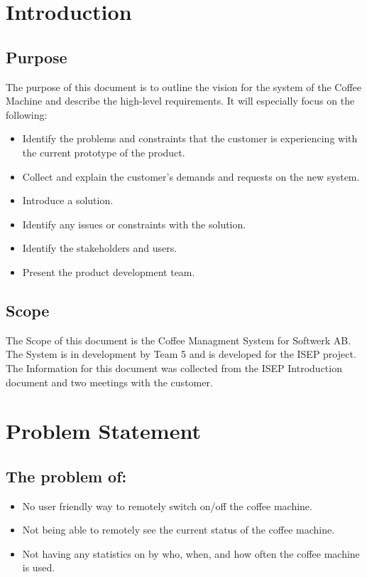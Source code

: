 \section{Introduction}

\subsection{Purpose}

The purpose of this document is to outline the vision for the system of the Coffee Machine and describe the high-level requirements. It will especially focus on the following:

\begin{itemize}

\item Identify the problems and constraints that the customer is experiencing with the current prototype of the product.
\item Collect and explain the customer’s demands and requests on the new system.
\item Introduce a solution.
\item Identify any issues or constraints with the solution.
\item Identify the stakeholders and users.
\item Present the product development team.

\end{itemize}

\subsection{Scope}

The Scope of this document is the Coffee Managment System for Softwerk AB. The System is in development by Team 5 and is developed for the ISEP project. The Information for this document was collected from the ISEP Introduction document and two meetings with the customer.

\clearpage

\section{Problem Statement}

\subsection{The problem of:}

\begin{itemize}
\item No user friendly way to remotely switch on/off the coffee machine.
\item Not being able to remotely see the current status of the coffee machine.
\item Not having any statistics on by who, when, and how often the coffee machine is used.
\end{itemize}

